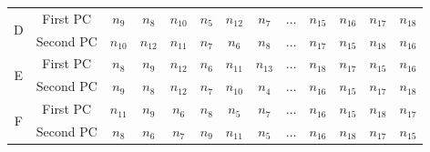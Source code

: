 {\begin{table}[!ht]
\begin{tabular}{|c|c|c|c|c|c|c|c|c|c|c|c|c|}
      \hline
      \cline{1-13}
      \multirow{2}{*}{D}& First PC & \cellcolor[gray]{0.7} $n_{9}$ & \cellcolor[gray]{0.7} $n_{8}$ & \cellcolor[gray]{0.7} $n_{10}$ & \cellcolor[gray]{0.6} $n_{5}$ & \cellcolor[gray]{0.7} $n_{12}$ & \cellcolor[gray]{0.7} $n_{7}$ & $\dots$ &  \cellcolor[gray]{0.9}  $n_{15}$ & \cellcolor[gray]{0.9} $n_{16}$ & \cellcolor[gray]{0.9} $n_{17}$ & \cellcolor[gray]{0.9}  $n_{18}$ \\ 
      \cline{2-13}
      & Second PC & \cellcolor[gray]{0.7} $n_{10}$ & \cellcolor[gray]{0.7} $n_{12}$ & \cellcolor[gray]{0.7} $n_{11}$ & \cellcolor[gray]{0.7} $n_{7}$ & \cellcolor[gray]{0.6} $n_{6}$ & \cellcolor[gray]{0.7} $n_{8}$ & $\dots$ &  \cellcolor[gray]{0.9} $n_{17}$ & \cellcolor[gray]{0.9} $n_{15}$ & \cellcolor[gray]{0.9} $n_{18}$ & \cellcolor[gray]{0.9}  $n_{16}$ \\ 
      \hline
      \cline{1-13}
      \multirow{2}{*}{E}& First PC & \cellcolor[gray]{0.7} $n_{8}$ & \cellcolor[gray]{0.7} $n_{9}$ & \cellcolor[gray]{0.7} $n_{12}$ & \cellcolor[gray]{0.6} $n_{6}$ & \cellcolor[gray]{0.7} $n_{11}$ & \cellcolor[gray]{0.8} $n_{13}$ & $\dots$ &  \cellcolor[gray]{0.9} $n_{18}$ & \cellcolor[gray]{0.9} $n_{17}$ & \cellcolor[gray]{0.9} $n_{15}$ & \cellcolor[gray]{0.9}  $n_{16}$ \\ 
      \cline{2-13}
      & Second PC & \cellcolor[gray]{0.7} $n_{9}$ & \cellcolor[gray]{0.7} $n_{8}$ & \cellcolor[gray]{0.7} $n_{12}$ & \cellcolor[gray]{0.7} $n_{7}$ & \cellcolor[gray]{0.7} $n_{10}$ & \cellcolor[gray]{0.6} $n_{4}$ & $\dots$ &  \cellcolor[gray]{0.9} $n_{16}$ & \cellcolor[gray]{0.9} $n_{15}$ & \cellcolor[gray]{0.9} $n_{17}$ & \cellcolor[gray]{0.9} $n_{18}$ \\ 
      \hline
      \cline{1-13}
      \multirow{2}{*}{F}& First PC & \cellcolor[gray]{0.7} $n_{11}$ & \cellcolor[gray]{0.7} $n_{9}$ & \cellcolor[gray]{0.6} $n_{6}$ & \cellcolor[gray]{0.7} $n_{8}$ & \cellcolor[gray]{0.6} $n_{5}$ & \cellcolor[gray]{0.7} $n_{7}$ & $\dots$ &  \cellcolor[gray]{0.9}  $n_{16}$ & \cellcolor[gray]{0.9}  $n_{15}$ & \cellcolor[gray]{0.9} $n_{18}$ & \cellcolor[gray]{0.9} $n_{17}$ \\ 
      \cline{2-13}
      & Second PC & \cellcolor[gray]{0.7} $n_{8}$ & \cellcolor[gray]{0.6} $n_{6}$ & \cellcolor[gray]{0.7} $n_{7}$ & \cellcolor[gray]{0.7} $n_{9}$ & \cellcolor[gray]{0.7} $n_{11}$ & \cellcolor[gray]{0.6} $n_{5}$ & $\dots$ &  \cellcolor[gray]{0.9} $n_{16}$ & \cellcolor[gray]{0.9} $n_{18}$ & \cellcolor[gray]{0.9} $n_{17}$ & \cellcolor[gray]{0.9} $n_{15}$ \\ 

\end{tabular}
\end{table}}
